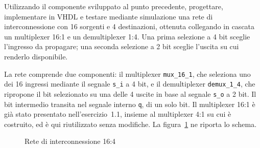 \label{sec:esercizio1-2}

\begin{traccia}
Utilizzando il componente sviluppato al punto precedente, progettare, implementare in VHDL e testare mediante simulazione una rete di interconnessione con 16 sorgenti e 4 destinazioni, ottenuta collegando in cascata un multiplexer 16:1 e un demultiplexer 1:4. Una prima selezione a 4 bit sceglie l'ingresso da propagare; una seconda selezione a 2 bit sceglie l'uscita su cui renderlo disponibile.
\end{traccia}

\progetto

La rete comprende due componenti: il multiplexer \texttt{mux\_16\_1}, che seleziona uno dei 16 ingressi mediante il segnale \texttt{s\_i} a 4 bit, e il demultiplexer \texttt{demux\_1\_4}, che ripropone il bit selezionato su una delle 4 uscite in base al segnale \texttt{s\_o} a 2 bit. Il bit intermedio transita nel segnale interno \texttt{q}, di un solo bit. Il multiplexer 16:1 è già stato presentato nell'esercizio~1.1, insieme al multiplexer 4:1 su cui è costruito, ed è qui riutilizzato senza modifiche. La figura~\ref{fig:esercizio1-2:schema} ne riporta lo schema.

\begin{figure}[H]
  \centering
  \caption{Rete di interconnessione 16:4}
  \label{fig:esercizio1-2:schema}
\end{figure}

